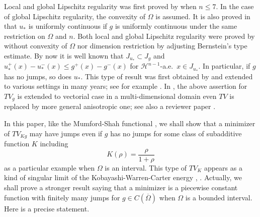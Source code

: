 \documentclass[11pt]{amsart} %
\numberwithin{equation}{section}
\begin{document}
Local and global Lipschitz regularity was first proved by \cite{CCN11} when $n\le7$.
 In the case of global Lipschitz  regularity, the convexity of $\Omega$ is assumed.
 It is also proved in \cite{CCN11} that $u_*$ is uniformly continuous if $g$ is uniformly continuous under the same restriction on $\Omega$ and $n$.
 Both local and global Lipschitz regularity were proved by \cite{P} without convexity of $\Omega$ nor dimension restriction by adjusting Bernstein's type estimate.
 By now it is well known that $J_{u_*}\subset J_g$ and $u_*^+(x) - u_*^-(x)\leq g^+(x)-g^-(x)$ for $\mathcal{H}^{n-1}$-a.e.\ $x\in J_{u_{\ast}}$.
 In particular, if $g$ has no jumps, so does $u_*$.
 This type of result was first obtained by \cite{CCN07} and extended to various settings in many years; see for example \cite{DS19, CJN13, Mer18}.
 In \cite{CL}, the above assertion for $TV_g$ is extended to vectorial case in a multi-dimensional domain even $TV$ is replaced by more general anisotropic one; see also a reviewer paper \cite{GKL}.

In this paper, like the Mumford-Shah functional \cite{MS89}, we shall show that a minimizer of $TV_{Kg}$ may have jumps even if $g$ has no jumps for some class of subadditive function $K$ including
\[
	K(\rho) = \frac{\rho}{1+\rho}
\]
as a particular example when $\Omega$ is an interval.
 This type of $TV_K$ appears as a kind of singular limit of the Kobayashi-Warren-Carter energy \cite{GOU}, \cite{GOSU}.
 Actually, we shall prove a stronger result saying that a minimizer is a piecewise constant function with finitely many jumps for $g\in C(\overline{\Omega})$ when $\Omega$ is a bounded interval.
 Here is a precise statement.
\end{document}
